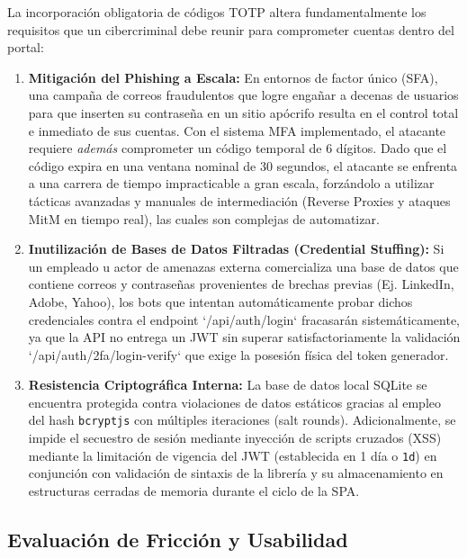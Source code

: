 \documentclass[12pt,a4paper]{article}
\begin{document}
La incorporación obligatoria de códigos TOTP altera fundamentalmente los requisitos que un cibercriminal debe reunir para comprometer cuentas dentro del portal:

\begin{enumerate}
    \item \textbf{Mitigación del Phishing a Escala:} En entornos de factor único (SFA), una campaña de correos fraudulentos que logre engañar a decenas de usuarios para que inserten su contraseña en un sitio apócrifo resulta en el control total e inmediato de sus cuentas. Con el sistema MFA implementado, el atacante requiere \textit{además} comprometer un código temporal de 6 dígitos. Dado que el código expira en una ventana nominal de 30 segundos, el atacante se enfrenta a una carrera de tiempo impracticable a gran escala, forzándolo a utilizar tácticas avanzadas y manuales de intermediación (Reverse Proxies y ataques MitM en tiempo real), las cuales son complejas de automatizar.
    \item \textbf{Inutilización de Bases de Datos Filtradas (Credential Stuffing):} Si un empleado u actor de amenazas externa comercializa una base de datos que contiene correos y contraseñas provenientes de brechas previas (Ej. LinkedIn, Adobe, Yahoo), los bots que intentan automáticamente probar dichos credenciales contra el endpoint `/api/auth/login` fracasarán sistemáticamente, ya que la API no entrega un JWT sin superar satisfactoriamente la validación `/api/auth/2fa/login-verify` que exige la posesión física del token generador.
    \item \textbf{Resistencia Criptográfica Interna:} La base de datos local SQLite se encuentra protegida contra violaciones de datos estáticos gracias al empleo del hash \texttt{bcryptjs} con múltiples iteraciones (salt rounds). Adicionalmente, se impide el secuestro de sesión mediante inyección de scripts cruzados (XSS) mediante la limitación de vigencia del JWT (establecida en 1 día o \texttt{1d}) en conjunción con validación de sintaxis de la librería y su almacenamiento en estructuras cerradas de memoria durante el ciclo de la SPA.
\end{enumerate}

\subsection{Evaluación de Fricción y Usabilidad}
\end{document}
